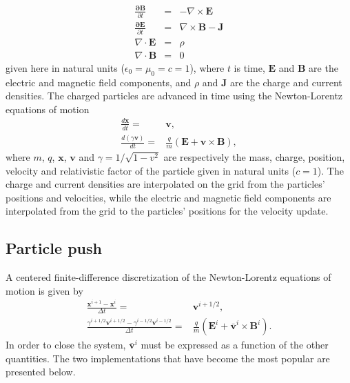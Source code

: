\documentclass[]{report}
\begin{document}
\begin{subequations}
\begin{eqnarray}
\frac{\mathbf{\partial B}}{\partial t} & = & -\nabla\times\mathbf{E}\label{Eq:Faraday-1}\\
\frac{\mathbf{\partial E}}{\partial t} & = & \nabla\times\mathbf{B}-\mathbf{J}\label{Eq:Ampere-1}\\
\nabla\cdot\mathbf{E} & = & \rho\label{Eq:Gauss-1}\\
\nabla\cdot\mathbf{B} & = & 0\label{Eq:divb-1}
\end{eqnarray}
\end{subequations}
given here in natural units ($\epsilon_0=\mu_0=c=1$), where $t$ is time, $\mathbf{E}$ and
$\mathbf{B}$ are the electric and magnetic field components, and
$\rho$ and $\mathbf{J}$ are the charge and current densities. The
charged particles are advanced in time using the Newton-Lorentz equations
of motion
\begin{subequations}
\begin{align}
\frac{d\mathbf{x}}{dt}= & \mathbf{v},\label{Eq:Lorentz_x-1}\\
\frac{d\left(\gamma\mathbf{v}\right)}{dt}= & \frac{q}{m}\left(\mathbf{E}+\mathbf{v}\times\mathbf{B}\right),\label{Eq:Lorentz_v-1}
\end{align}
\end{subequations}
where $m$, $q$, $\mathbf{x}$, $\mathbf{v}$ and $\gamma=1/\sqrt{1-v^{2}}$
 are respectively the mass, charge, position, velocity and relativistic
factor of the particle given in natural units ($c=1$). The charge and current densities are interpolated
on the grid from the particles' positions and velocities, while the
electric and magnetic field components are interpolated from the grid
to the particles' positions for the velocity update.

\subsection{Particle push}

A centered finite-difference discretization of the Newton-Lorentz
equations of motion is given by
\begin{subequations}
\begin{align}
\frac{\mathbf{x}^{i+1}-\mathbf{x}^{i}}{\Delta t}= & \mathbf{v}^{i+1/2},\label{Eq:leapfrog_x}\\
\frac{\gamma^{i+1/2}\mathbf{v}^{i+1/2}-\gamma^{i-1/2}\mathbf{v}^{i-1/2}}{\Delta t}= & \frac{q}{m}\left(\mathbf{E}^{i}+\mathbf{\bar{v}}^{i}\times\mathbf{B}^{i}\right).\label{Eq:leapfrog_v}
\end{align}
\end{subequations}
In order to close the system, $\bar{\mathbf{v}}^{i}$ must be
expressed as a function of the other quantities. The two implementations that have become the most popular are presented below.
\end{document}
